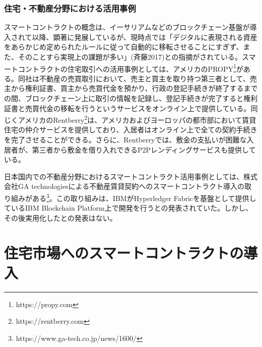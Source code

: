 \documentclass[a4paper,fontsize=11pt,report,notitlepage,line_length=38zw,number_of_lines=40,dvipdfmx]{jlreq}
\begin{document}
\subsection{住宅・不動産分野における活用事例}
スマートコントラクトの概念は、イーサリアムなどのブロックチェーン基盤が導入されて以降、顕著に発展しているが、現時点では「デジタルに表現される資産をあらかじめ定められたルールに従って自動的に移転させることにすぎず、また、そのことすら実現上の課題が多い」(斉藤2017)\cite{saito2017}との指摘がされている。スマートコントラクトの住宅取引への活用事例としては、アメリカのPROPY\footnote{https://propy.com}がある。同社は不動産の売買取引において、売主と買主を取り持つ第三者として、売主から権利証書、買主から売買代金を預かり、行政の登記手続きが終了するまでの間、ブロックチェーン上に取引の情報を記録し、登記手続きが完了すると権利証書と売買代金の移転を行うというサービスをオンライン上で提供している。同じくアメリカのRentberry\footnote{https://rentberry.com}は、アメリカおよびヨーロッパの都市部において賃貸住宅の仲介サービスを提供しており、入居者はオンライン上で全ての契約手続きを完了させることができる。さらに、Rentberryでは、敷金の支払いが困難な入居者が、第三者から敷金を借り入れできるP2Pレンディングサービスも提供している。

日本国内での不動産分野におけるスマートコントラクト活用事例としては、株式会社GA technologiesによる不動産賃貸契約へのスマートコントラクト導入の取り組みがある\footnote{https://www.ga-tech.co.jp/news/1600/}。この取り組みは、IBMがHyperledger Fabricを基盤として提供しているIBM Blockchain Platform上で開発を行うとの発表されていた。しかし、その後実用化したとの発表はない。

\chapter{住宅市場へのスマートコントラクトの導入}
\end{document}
